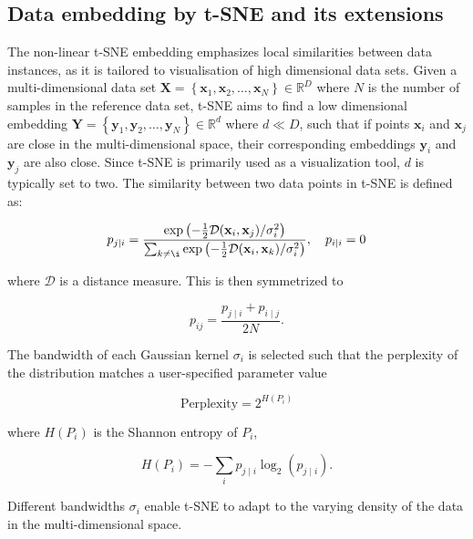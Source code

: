 \documentclass[runningheads]{llncs}
\begin{document}
\subsection{Data embedding by t-SNE and its extensions\label{sec:tsne}}

The non-linear t-SNE embedding emphasizes local similarities between data instances, 
as it is tailored to visualisation of high dimensional data sets. 
Given a multi-dimensional data set $\mathbf{X} =
\left \{ \mathbf{x}_1, \mathbf{x}_2, \dots, \mathbf{x}_N \right \} \in
\mathbb{R}^D$ where $N$ is the number of samples in the reference data set,
t-SNE aims to find a low dimensional embedding $\mathbf{Y} = \left \{
\mathbf{y}_1, \mathbf{y}_2, \dots, \mathbf{y}_N \right \} \in \mathbb{R}^d$
where $d \ll D$, such that if points $\mathbf{x}_i$ and $\mathbf{x}_j$ are
close in the multi-dimensional space, their corresponding embeddings
$\mathbf{y}_i$ and $\mathbf{y}_j$ are also close. Since t-SNE is primarily used
as a visualization tool, $d$ is typically set to two. The similarity between
two data points in t-SNE is defined as:

\begin{equation}
p_{j \mid i} = \frac{\exp \left ( -\frac{1}{2} \mathcal{D}(\mathbf{x}_i, \mathbf{x}_j ) / \sigma_i^2 \right )}
{\sum_{k \neq \i } \exp \left ( -\frac{1}{2} \mathcal{D}(\mathbf{x}_i, \mathbf{x}_k ) / \sigma_i^2 \right )}, \quad p_{i \mid i} = 0
\label{eq:gaussian_kernel}
\end{equation}

\noindent where $\mathcal{D}$ is a distance measure. This is then symmetrized to

\begin{equation}
p_{ij} = \frac{p_{j \mid i} + p_{i \mid j}}{2N}.
\label{eq:symmetrize}
\end{equation}

The bandwidth of each Gaussian kernel $\sigma_i$ is selected such that the
perplexity of the distribution matches a user-specified parameter value

\begin{equation}
\text{Perplexity} = 2^{H(P_i)}
\end{equation}

\noindent where $H(P_i)$ is the Shannon entropy of $P_i$,

\begin{equation}
H(P_i) = -\sum_i p_{j \mid i} \log_2 (p_{j \mid i}).
\end{equation}

\noindent Different bandwidths $\sigma_i$ enable t-SNE to adapt to the varying
density of the data in the multi-dimensional space.
\end{document}
